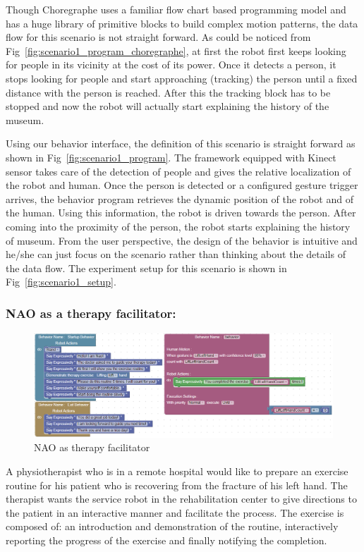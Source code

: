 \documentclass{llncs}
\begin{document}
	Though Choregraphe uses a familiar flow chart based programming model and has a huge library of primitive blocks to build complex motion patterns, the data flow for this scenario is not straight forward. As could be noticed from Fig~\ref{fig:scenario1_program_choregraphe}, at first the robot first keeps looking for people in its vicinity at the cost of its power. Once it detects a person, it stops looking for people and start approaching (tracking) the person until a fixed distance with the person is reached. After this the tracking block has to be stopped and now the robot will actually start explaining the history of the museum.
	
	Using our behavior interface, the definition of this scenario is straight forward as shown in Fig~\ref{fig:scenario1_program}. The framework equipped with Kinect sensor takes care of the detection of people and gives the relative localization of the robot and human. Once the person is detected or a configured gesture trigger arrives, the behavior program retrieves the dynamic position of the robot and of the human. Using this information, the robot is driven towards the person. After coming into the proximity of the person, the robot starts explaining the history of museum. From the user perspective, the design of the behavior is intuitive and he/she can just focus on the scenario rather than thinking about the details of the data flow. The experiment setup for this scenario is shown in Fig~\ref{fig:scenario1_setup}.
\subsubsection{NAO as a therapy facilitator:}%
\begin{figure}
\includegraphics[width=\textwidth]{../thesis/assets/scenario2_horizontal.png}
\caption[NAO as therapy facilitator]{NAO as therapy facilitator}
\label{fig:scenario2_program}
\end{figure}
	A physiotherapist who is in a remote hospital would like to prepare an exercise routine for his patient who is recovering from the fracture of his left hand. The therapist wants the service robot in the rehabilitation center to give directions to the patient in an interactive manner and facilitate the process. The exercise is composed of: an introduction and demonstration of the routine, interactively reporting the progress of the exercise and finally notifying the completion. 
	
\end{document}
